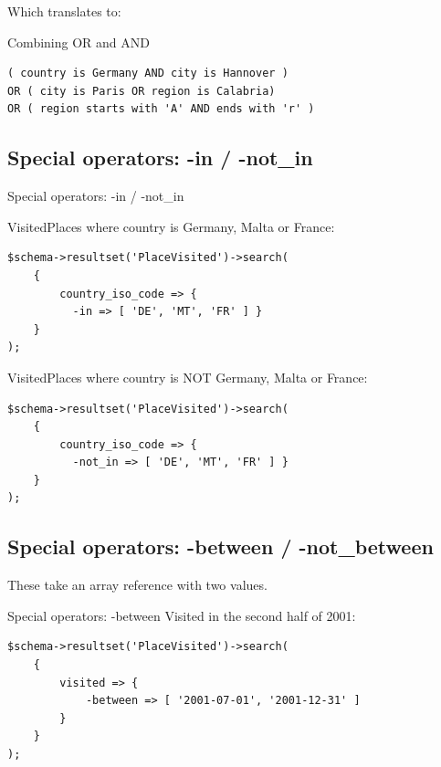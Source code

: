 Which translates to:

\begin{frame}[fragile]{Combining OR and AND}

\begin{lstlisting}
( country is Germany AND city is Hannover )
OR ( city is Paris OR region is Calabria)
OR ( region starts with 'A' AND ends with 'r' )
\end{lstlisting}

\end{frame}

\subsection{Special operators: -in / -not\_in}
\begin{frame}[fragile]{Special operators: -in / -not\_in}

VisitedPlaces where country is Germany, Malta or France:

\begin{lstlisting}
$schema->resultset('PlaceVisited')->search(
    {
        country_iso_code => { 
          -in => [ 'DE', 'MT', 'FR' ] }
    }
);
\end{lstlisting}

VisitedPlaces where country is NOT Germany, Malta or France:

\begin{lstlisting}
$schema->resultset('PlaceVisited')->search(
    {
        country_iso_code => { 
          -not_in => [ 'DE', 'MT', 'FR' ] }
    }
);
\end{lstlisting}
\end{frame}

\subsection{Special operators: -between / -not\_between}

These take an array reference with two values.

\begin{frame}[fragile]{Special operators: -between}
Visited in the second half of 2001:

\begin{lstlisting}
$schema->resultset('PlaceVisited')->search(
    {
        visited => {
            -between => [ '2001-07-01', '2001-12-31' ]
        }
    }
);
\end{lstlisting}
\end{frame}

